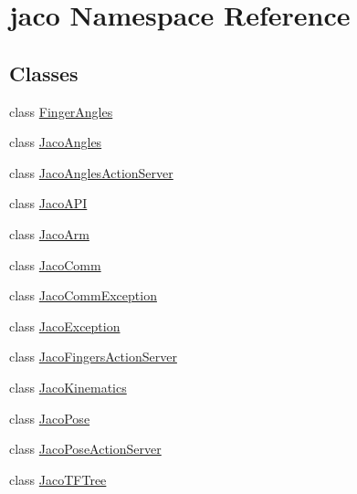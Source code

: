 \hypertarget{namespacejaco}{}\section{jaco Namespace Reference}
\label{namespacejaco}
\subsection*{Classes}
\begin{DoxyCompactItemize}
\item 
class \hyperlink{classjaco_1_1_finger_angles}{Finger\+Angles}
\item 
class \hyperlink{classjaco_1_1_jaco_angles}{Jaco\+Angles}
\item 
class \hyperlink{classjaco_1_1_jaco_angles_action_server}{Jaco\+Angles\+Action\+Server}
\item 
class \hyperlink{classjaco_1_1_jaco_a_p_i}{Jaco\+A\+PI}
\item 
class \hyperlink{classjaco_1_1_jaco_arm}{Jaco\+Arm}
\item 
class \hyperlink{classjaco_1_1_jaco_comm}{Jaco\+Comm}
\item 
class \hyperlink{classjaco_1_1_jaco_comm_exception}{Jaco\+Comm\+Exception}
\item 
class \hyperlink{classjaco_1_1_jaco_exception}{Jaco\+Exception}
\item 
class \hyperlink{classjaco_1_1_jaco_fingers_action_server}{Jaco\+Fingers\+Action\+Server}
\item 
class \hyperlink{classjaco_1_1_jaco_kinematics}{Jaco\+Kinematics}
\item 
class \hyperlink{classjaco_1_1_jaco_pose}{Jaco\+Pose}
\item 
class \hyperlink{classjaco_1_1_jaco_pose_action_server}{Jaco\+Pose\+Action\+Server}
\item 
class \hyperlink{classjaco_1_1_jaco_t_f_tree}{Jaco\+T\+F\+Tree}
\end{DoxyCompactItemize}

